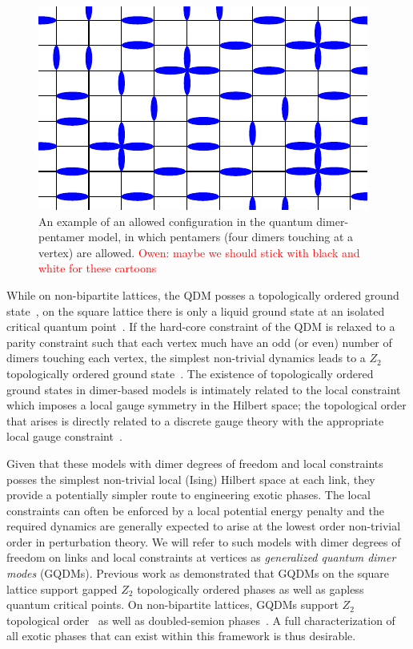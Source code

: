 \documentclass[twocolumn,prb,aps,floatfix,superscriptaddress]{revtex4-1}
\newcommand{\note}[1]{\textcolor{red}{#1}}
\begin{document}
\begin{figure}[t!]
    \centering
    \includegraphics[width=0.75\columnwidth]{QDPM_ex_config.pdf}
    \caption{An example of an allowed configuration in the quantum dimer-pentamer model, in which pentamers (four dimers touching at a vertex) are allowed. \note{Owen: maybe we should stick with black and white for these cartoons}}
    \label{fig:QDPMex}
\end{figure}

While on non-bipartite lattices, the QDM posses a topologically ordered ground state~\cite{Moessner2001a,Fendley2002}, on the square lattice there is only a liquid ground state at an isolated critical quantum point~\cite{Leung1996,Syljuasen2006}. If the hard-core constraint of the QDM is relaxed to a parity constraint such that each vertex much have an odd (or even) number of dimers touching each vertex, the simplest non-trivial dynamics leads to a $Z_2$ topologically ordered ground state~\cite{Kitaev2003,Wen2003}. The existence of topologically ordered ground states in dimer-based models is intimately related to the local constraint which imposes a local gauge symmetry in the Hilbert space; the topological order that arises is directly related to a discrete gauge theory with the appropriate local gauge constraint~\cite{Moessner2001}.

Given that these models with dimer degrees of freedom and local constraints posses the simplest non-trivial local (Ising) Hilbert space at each link, they provide a potentially simpler route to engineering exotic phases. The local constraints can often be enforced by a local potential energy penalty and the required dynamics are generally expected to arise at the lowest order non-trivial order in perturbation theory. We will refer to such models with dimer degrees of freedom on links and local constraints at vertices as \emph{generalized quantum dimer modes} (GQDMs). Previous work as demonstrated that GQDMs on the square lattice support gapped $Z_2$ topologically ordered phases as well as gapless quantum critical points. On non-bipartite lattices, GQDMs support $Z_2$ topological order~\cite{Moessner2001a,Misguich2002} as well as doubled-semion phases~\cite{Qi2014,Buerschaper2014a}. A full characterization of all exotic phases that can exist within this framework is thus desirable.
\end{document}
